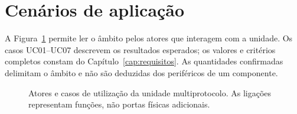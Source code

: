 \section{Cenários de aplicação}
\label{sec:cenarios-aplicacao}

A Figura~\ref{fig:contexto-utilizacao} permite ler o âmbito pelos atores
que interagem com a unidade. Os casos UC01--UC07 descrevem os resultados
esperados; os valores e critérios completos constam do
Capítulo~\ref{cap:requisitos}. As quantidades confirmadas delimitam o
âmbito e não são deduzidas dos periféricos de um componente.

\begin{figure}[htbp]
    \centering
    \caption[Atores e casos de utilização.]{Atores e casos de utilização da unidade multiprotocolo. As ligações representam funções, não portas físicas adicionais.}
    \label{fig:contexto-utilizacao}
\end{figure}

